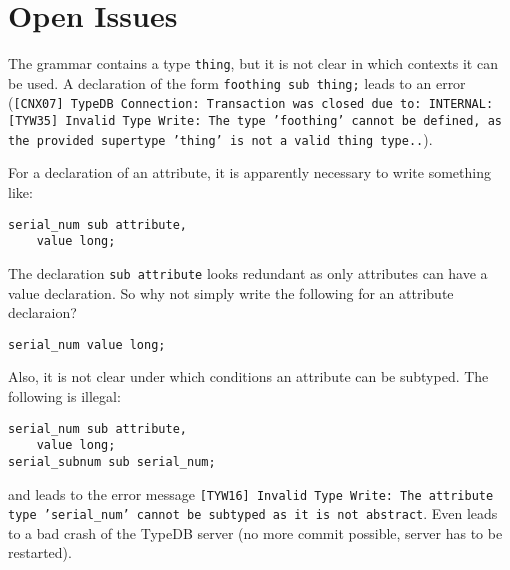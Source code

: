 \section{Open Issues}\label{sec:open_issues}


\begin{issue}\label{issue:thing_type}
The grammar contains a type \texttt{thing}, but it is not clear in which
  contexts it can be used. A declaration of the form \texttt{foothing sub
    thing;} leads to an error (\texttt{[CNX07] TypeDB Connection: Transaction
    was closed due to: INTERNAL: [TYW35] Invalid Type Write: The type
    'foothing' cannot be defined, as the provided supertype 'thing' is not a
    valid thing type..}).
\end{issue}

\begin{issue}\label{issue:decl_attribute}
For a declaration of an attribute, it is apparently necessary to write
something like:
\begin{verbatim}
serial_num sub attribute,
    value long;
\end{verbatim}
The declaration \texttt{sub attribute} looks redundant as only attributes can
have a value declaration. So why not simply write the following for an
attribute declaraion?
\begin{verbatim}
serial_num value long;
\end{verbatim}

Also, it is not clear under which conditions an attribute can be subtyped. The
  following is illegal:
  \begin{verbatim}
serial_num sub attribute,
    value long;
serial_subnum sub serial_num;
  \end{verbatim}
  
  and leads to the error message \texttt{[TYW16] Invalid Type Write: The
    attribute type 'serial\_num' cannot be subtyped as it is not abstract}.
  Even leads to a bad crash of the TypeDB server (no more commit possible,
  server has to be restarted). 
\end{issue}


